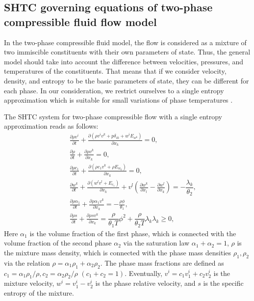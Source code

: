 \documentclass[3p,times,table]{article}
\begin{document}
\subsection{SHTC governing equations of two-phase compressible fluid flow model}
\label{sec.twophase}

In the two-phase compressible fluid model, the flow is considered  
as a mixture of two 
immiscible constituents with their own parameters of state. Thus, the general model should take into 
account the difference between velocities, pressures, and temperatures of the 
constituents. That means that if 
we consider  velocity, density, and entropy to be the basic parameters of 
state, they can be 
different for each phase. In our consideration, we restrict ourselves to a 
single entropy 
approximation which is suitable for small variations of phase temperatures 
\cite{Romenski2016}.

The SHTC system for two-phase compressible flow with a single entropy approximation 
\cite{RomDrikToro2010} reads as follows:
\begin{subequations}\label{eqn.HPRFF}
\begin{eqnarray}
&&\displaystyle\frac{\partial \rho v^i}{\partial t}+\frac{\partial 
	(\rho v^i v^k + p \delta_{ik} + w^iE_{w^k} )}{\partial x_k}=0, 
\label{eqn.momentumFF}\\[2mm]
&& \frac{\partial \rho}{\partial t}+\frac{\partial \rho v^k}{\partial 
	x_k}=0,\label{eqn.contiFF}\\[2mm]
&& \frac{\partial \rho c_1}{\partial t}+\frac{\partial (\rho c_1 v^k+\rho E_{w_k})}{\partial 
	x_k}=0,\label{eqn.contiFF1}\\[2mm]
&&\displaystyle\frac{\partial w^k}{\partial t}+\frac{\partial(w^lv^l+E_{c_1})}{\partial x_k}+v^l\left(\frac{\partial w^k}{\partial x_l}-
\frac{\partial w^l}{\partial x_k}\right)=-\dfrac{ \lambda_{k} }{\theta_2},\label{eqn.relvel}\\[2mm]
&& \frac{\partial \rho \alpha_1}{\partial t}+\frac{\partial \rho \alpha_1 v^k }{\partial x_k}=-\frac{\rho \phi}{\theta_1},\label{eqn.alphaFF}\\[2mm]
&&\displaystyle\frac{\partial \rho s}{\partial t}+\frac{\partial \rho 
	s v^k }{\partial x_k}=\dfrac{\rho}{\theta_1 T}\phi^2 +
\dfrac{\rho}{\theta_2 T}\lambda_k \lambda_k \geq0, 
\label{eqn.entropyFF}
\end{eqnarray}
\end{subequations}
Here $\alpha_1$ is the volume fraction of the first phase, which is connected 
with the volume 
fraction of the second phase $\alpha_2$ via the saturation law 
$\alpha_1+\alpha_2=1$, $\rho$ is the mixture mass density, which is connected 
with the phase mass densities $\rho_1,\rho_2$ via the relation 
$\rho=\alpha_1\rho_1+\alpha_2\rho_2$. The phase mass fractions are defined as 
$c_1=\alpha_1 \rho_1/\rho, c_2=\alpha_2 \rho_2/\rho$  $(c_1+c_2=1)$. 
Eventually, 
$v^i=c_1v_1^i+c_2v_2^i$ is the mixture velocity, $w^i=v_1^i-v_2^i$ is the 
phase relative velocity, and $s$ is the specific entropy of the mixture.
\end{document}

